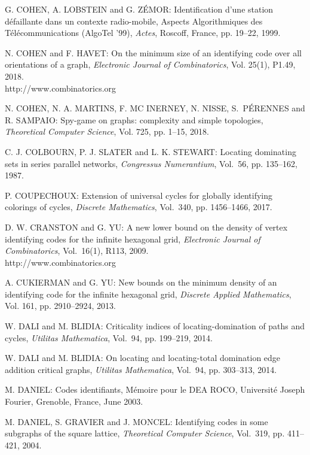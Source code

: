 \begin{thebibliography}{999}
G. COHEN, A. LOBSTEIN and G. Z\'EMOR: Identification d'une station d\'efaillante dans un contexte radio-mobile, Aspects Algorithmiques des T\'el\'ecommunications (AlgoTel '99), {\it Actes}, Roscoff, France, pp. 19--22, 1999.

N. COHEN and F. HAVET: On the minimum size of an identifying code over all orientations of a graph, {\it Electronic Journal of Combinatorics}, Vol. 25(1), P1.49, 2018.\\
http://www.combinatorics.org

N. COHEN, N. A. MARTINS, F. MC INERNEY, N. NISSE, S.~P\'E\-RENNES and R. SAMPAIO: Spy-game on graphs: complexity and simple topologies, {\it Theoretical Computer Science}, Vol. 725, pp. 1--15, 2018. 

C. J. COLBOURN, P. J. SLATER and L. K. STEWART: Locating dominating sets in series parallel networks, {\it Congressus Numerantium}, Vol.~56, pp. 135--162, 1987.

P. COUPECHOUX: Extension of universal cycles for globally identifying colorings of cycles, {\it Discrete Mathematics}, Vol.~340, pp. 1456--1466, 2017.
  
D. W. CRANSTON and G. YU: A new lower bound on the density of vertex identifying codes for the infinite hexagonal grid, {\it Electronic Journal of Combinatorics}, Vol.~16(1), R113, 2009.\\
http://www.combinatorics.org   

A. CUKIERMAN and G. YU: New bounds on the minimum density of an identifying code for the infinite hexagonal grid, {\it Discrete Applied Mathematics}, Vol. 161, pp. 2910--2924, 2013.

  W. DALI and M. BLIDIA: Criticality indices of locating-domination of paths and cycles, {\it Utilitas Mathematica}, Vol.~94, pp. 199--219, 2014.

W. DALI and M. BLIDIA: On locating and locating-total domination edge addition critical graphs, {\it Utilitas Mathematica}, Vol.~94, pp. 303--313, 2014.

M. DANIEL: Codes identifiants, M\'emoire pour le DEA ROCO, Universit\'e Joseph Fourier, Grenoble, France, June 2003.

M. DANIEL, S. GRAVIER and J. MONCEL: Identifying codes in some subgraphs of the square lattice, {\it Theoretical Computer Science}, Vol.~319, pp. 411--421, 2004.


\end{thebibliography}
